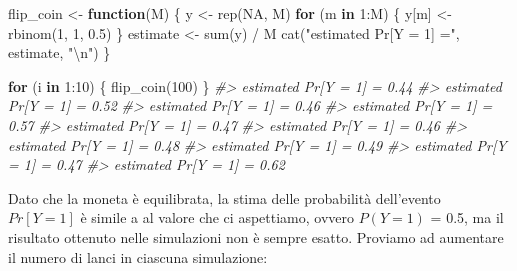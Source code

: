 \documentclass[
  11pt,
]{krantz}
\makeatletter
\newenvironment{Shaded}{\begin{snugshade}}{\end{snugshade}}
\newcommand{\CommentTok}[1]{\textcolor[rgb]{0.37,0.37,0.37}{\textit{#1}}}
\newcommand{\ConstantTok}[1]{\textcolor[rgb]{0,0,0}{#1}}
\newcommand{\ControlFlowTok}[1]{\textcolor[rgb]{0.27,0.27,0.27}{\textbf{#1}}}
\newcommand{\DecValTok}[1]{\textcolor[rgb]{0.06,0.06,0.06}{#1}}
\newcommand{\FloatTok}[1]{\textcolor[rgb]{0.06,0.06,0.06}{#1}}
\newcommand{\FunctionTok}[1]{\textcolor[rgb]{0,0,0}{#1}}
\newcommand{\NormalTok}[1]{#1}
\newcommand{\OtherTok}[1]{\textcolor[rgb]{0.37,0.37,0.37}{#1}}
\newcommand{\SpecialCharTok}[1]{\textcolor[rgb]{0,0,0}{#1}}
\newcommand{\StringTok}[1]{\textcolor[rgb]{0.5,0.5,0.5}{#1}}
\newenvironment{kframe}{%
\medskip{}
\setlength{\fboxsep}{.8em}
 \def\at@end@of@kframe{}%
 \ifinner\ifhmode%
  \def\at@end@of@kframe{\end{minipage}}%
  \begin{minipage}{\columnwidth}%
 \fi\fi%
 \def\FrameCommand##1{\hskip\@totalleftmargin \hskip-\fboxsep
 \colorbox{shadecolor}{##1}\hskip-\fboxsep
     \hskip-\linewidth \hskip-\@totalleftmargin \hskip\columnwidth}%
 \MakeFramed {\advance\hsize-\width
   \@totalleftmargin\z@ \linewidth\hsize
   \@setminipage}}%
 {\par\unskip\endMakeFramed%
 \at@end@of@kframe}
\renewenvironment{Shaded}{\begin{kframe}}{\end{kframe}}
\theoremstyle{definition}
\theoremstyle{definition}
\theoremstyle{definition}
\theoremstyle{definition}
\theoremstyle{remark}
\makeatother
\begin{document}
\begin{Shaded}
\begin{Highlighting}[]
\NormalTok{flip\_coin }\OtherTok{\textless{}{-}} \ControlFlowTok{function}\NormalTok{(M) \{}
\NormalTok{  y }\OtherTok{\textless{}{-}} \FunctionTok{rep}\NormalTok{(}\ConstantTok{NA}\NormalTok{, M)}
  \ControlFlowTok{for}\NormalTok{ (m }\ControlFlowTok{in} \DecValTok{1}\SpecialCharTok{:}\NormalTok{M) \{}
\NormalTok{    y[m] }\OtherTok{\textless{}{-}} \FunctionTok{rbinom}\NormalTok{(}\DecValTok{1}\NormalTok{, }\DecValTok{1}\NormalTok{, }\FloatTok{0.5}\NormalTok{)}
\NormalTok{  \}}
\NormalTok{  estimate }\OtherTok{\textless{}{-}} \FunctionTok{sum}\NormalTok{(y) }\SpecialCharTok{/}\NormalTok{ M}
  \FunctionTok{cat}\NormalTok{(}\StringTok{"estimated Pr[Y = 1] ="}\NormalTok{, estimate, }\StringTok{"}\SpecialCharTok{\textbackslash{}n}\StringTok{"}\NormalTok{)}
\NormalTok{\}}
\end{Highlighting}
\end{Shaded}

\begin{Shaded}
\begin{Highlighting}[]
\ControlFlowTok{for}\NormalTok{ (i }\ControlFlowTok{in} \DecValTok{1}\SpecialCharTok{:}\DecValTok{10}\NormalTok{) \{}
  \FunctionTok{flip\_coin}\NormalTok{(}\DecValTok{100}\NormalTok{)}
\NormalTok{\}}
\CommentTok{\#\textgreater{} estimated Pr[Y = 1] = 0.44 }
\CommentTok{\#\textgreater{} estimated Pr[Y = 1] = 0.52 }
\CommentTok{\#\textgreater{} estimated Pr[Y = 1] = 0.46 }
\CommentTok{\#\textgreater{} estimated Pr[Y = 1] = 0.57 }
\CommentTok{\#\textgreater{} estimated Pr[Y = 1] = 0.47 }
\CommentTok{\#\textgreater{} estimated Pr[Y = 1] = 0.46 }
\CommentTok{\#\textgreater{} estimated Pr[Y = 1] = 0.48 }
\CommentTok{\#\textgreater{} estimated Pr[Y = 1] = 0.49 }
\CommentTok{\#\textgreater{} estimated Pr[Y = 1] = 0.47 }
\CommentTok{\#\textgreater{} estimated Pr[Y = 1] = 0.62}
\end{Highlighting}
\end{Shaded}

Dato che la moneta è equilibrata, la stima delle probabilità dell'evento \(Pr[Y = 1]\) è simile a al valore che ci aspettiamo, ovvero \(P(Y = 1)\) = 0.5, ma il risultato ottenuto nelle simulazioni non è sempre esatto. Proviamo ad aumentare il numero di lanci in ciascuna simulazione:
\end{document}
